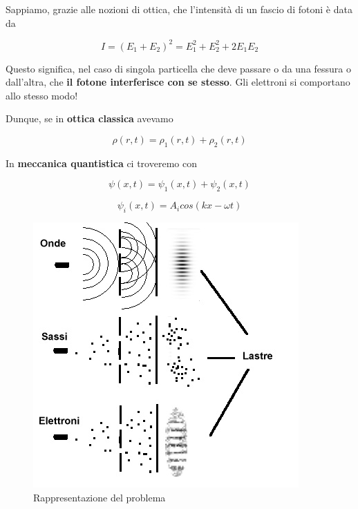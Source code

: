 Sappiamo, grazie alle nozioni di ottica, che l'intensità di un fascio di fotoni è data da

	\begin{equation}
	I = (E_1 + E_2)^2 = E_1^2 + E_2^2 + 2E_1E_2
\end{equation}

Questo significa, nel caso di singola particella che deve passare o da una fessura o dall'altra, che \textbf{il fotone interferisce con se stesso}. Gli elettroni si comportano allo stesso modo!

Dunque, se in \textbf{ottica classica} avevamo

\begin{equation}
\rho (r,t)= \rho_1 (r,t) + \rho_2 (r,t)
\end{equation}

In \textbf{meccanica quantistica} ci troveremo con

\begin{equation}
\psi (x,t)= \psi_1 (x,t) + \psi_2 (x,t)
\end{equation}

\begin{equation}
\psi_i (x,t)= A_i cos(kx-\omega t)
\end{equation}


 \begin{figure}[!htb]
	\begin{center}{\includegraphics[width=.5\textwidth]
		{./images/Elettroni_e_fenditure.jpg}
		\caption{\label{fig:my-label} Rappresentazione del problema}}
	\end{center}
\end{figure}
